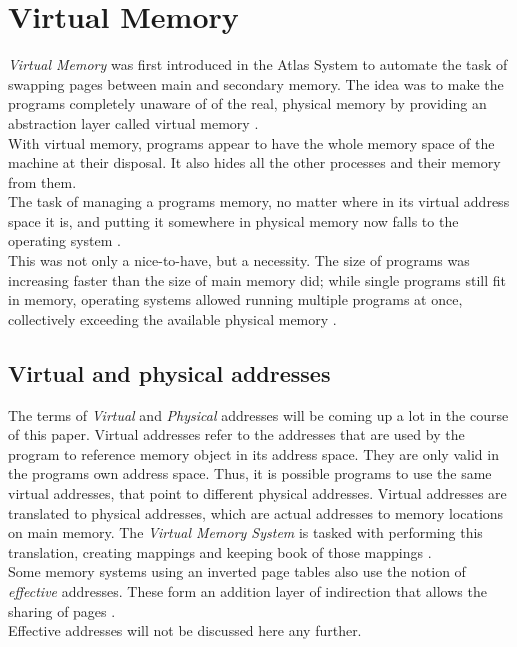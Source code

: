 \section{Virtual Memory}
\textit{Virtual Memory} was first introduced in the Atlas System \cite{fotheringham1961dynamic} to
automate the task of swapping pages between main and secondary memory.
The idea was to make the programs completely unaware of of the real, physical memory by providing
an abstraction layer called virtual memory \cite{denning1996virtual}.\\
With virtual memory, programs appear to have the whole memory space of the machine at their disposal. It also
hides all the other processes and their memory from them.\\
The task of managing a programs memory, no matter where in its virtual address space it is, and putting it somewhere
in physical memory now falls to the operating system \cite{denning1970virtual}.\\
This was not only a nice-to-have, but a necessity. The size of programs was increasing faster than the size of main
memory did; while single programs
still fit in memory, operating systems allowed running multiple programs at once, collectively exceeding
the available physical memory \cite{tanenbaumOS}.

\subsection{Virtual and physical addresses}
The terms of \textit{Virtual} and \textit{Physical} addresses will be coming up a lot in the course of this paper.
Virtual addresses refer to the addresses that are used by the program to reference memory object in its address
space. They are only valid in the programs own address space. Thus, it is possible programs to use the same
virtual addresses, that point to different physical addresses.
Virtual addresses are translated to physical addresses, which are actual addresses to memory locations
on main memory. The \textit{Virtual Memory System} is tasked with performing this translation, creating mappings
and keeping book of those mappings \cite{denning1996virtual}.
\\
Some memory systems using an inverted page tables also use the notion of \textit{effective} addresses.
These form an addition layer of indirection that allows the sharing of pages \cite{jacob1998virtualissues}.\\
Effective addresses will not be discussed here any further.

